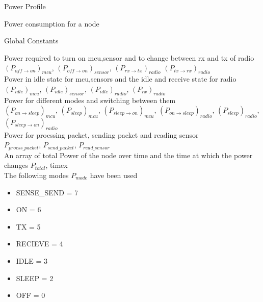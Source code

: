 \documentclass{article}
\begin{document}
\centerline{\sc \huge Power Profile}


\begin{center}
	\large{Power consumption for a node}
\end{center}

\begin{center}
	Global Constants
\end{center}

Power required to turn on mcu,sensor and to change between rx and tx of radio \\
$(P_{off \to on})_{mcu}$,
$(P_{off \to on})_{sensor}$,
$(P_{rx \to tx})_{radio}$
$(P_{tx \to rx})_{radio}$
\\

Power in idle state for mcu,sensors and the idle and receive state for radio \\
$(P_{idle})_{mcu}$,
$(P_{idle})_{sensor}$,
$(P_{idle})_{radio}$,
$(P_{rx})_{radio}$
\\

Power for different modes and switching between them \\
$(P_{on \to sleep})_{mcu}$,
$(P_{sleep})_{mcu}$,
$(P_{sleep \to on})_{mcu}$,
$(P_{on \to sleep})_{radio}$,
$(P_{sleep})_{radio}$,
$(P_{sleep \to on})_{radio}$
\\

Power for procssing packet, sending packet and reading sensor \\
$P_{procss\_packet}$,
$P_{send\_packet}$,
$P_{read\_sensor}$
\\

An array of total Power of the node over time and the time at which the power changes
$P_{total}$, timex
\\

The following modes $P_{mode}$ have been used
\begin{itemize}
	\item SENSE\_SEND = 7
	\item ON = 6
	\item TX = 5
	\item RECIEVE = 4
	\item IDLE = 3
	\item SLEEP = 2
	\item OFF = 0
\end{itemize}
\end{document}
